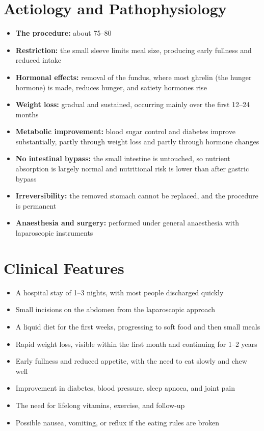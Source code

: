 \section*{Aetiology and Pathophysiology}
\begin{itemize}
    \item \textbf{The procedure:} about 75--80%
    \item \textbf{Restriction:} the small sleeve limits meal size, producing early fullness and reduced intake
    \item \textbf{Hormonal effects:} removal of the fundus, where most ghrelin (the hunger hormone) is made, reduces hunger, and satiety hormones rise
    \item \textbf{Weight loss:} gradual and sustained, occurring mainly over the first 12--24 months
    \item \textbf{Metabolic improvement:} blood sugar control and diabetes improve substantially, partly through weight loss and partly through hormone changes
    \item \textbf{No intestinal bypass:} the small intestine is untouched, so nutrient absorption is largely normal and nutritional risk is lower than after gastric bypass
    \item \textbf{Irreversibility:} the removed stomach cannot be replaced, and the procedure is permanent
    \item \textbf{Anaesthesia and surgery:} performed under general anaesthesia with laparoscopic instruments
\end{itemize}

\section*{Clinical Features}
\begin{itemize}
    \item A hospital stay of 1--3 nights, with most people discharged quickly
    \item Small incisions on the abdomen from the laparoscopic approach
    \item A liquid diet for the first weeks, progressing to soft food and then small meals
    \item Rapid weight loss, visible within the first month and continuing for 1--2 years
    \item Early fullness and reduced appetite, with the need to eat slowly and chew well
    \item Improvement in diabetes, blood pressure, sleep apnoea, and joint pain
    \item The need for lifelong vitamins, exercise, and follow-up
    \item Possible nausea, vomiting, or reflux if the eating rules are broken
\end{itemize}

